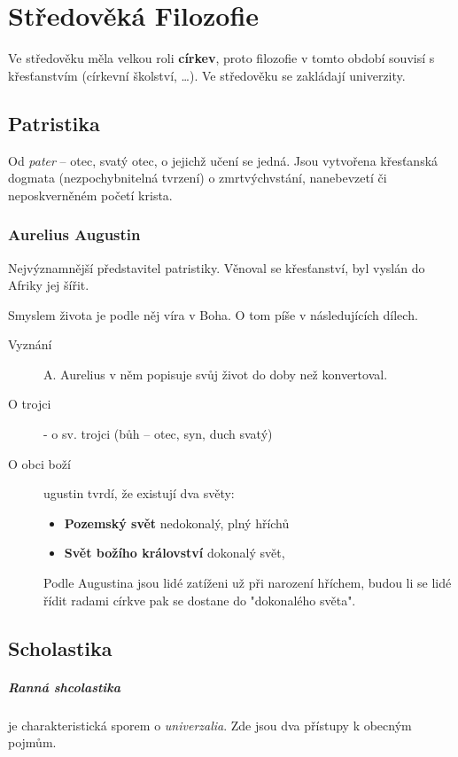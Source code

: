 \documentclass[10pt,a4paper,
twoside,%
]{report}
\begin{document}
\chapter{Středověká Filozofie}

Ve středověku měla velkou roli \textbf{církev}, proto filozofie v tomto období  souvisí s křesťanstvím (církevní školství, \dots). Ve středověku se zakládají univerzity.

\section{Patristika}

Od \emph{pater} -- otec, svatý otec, o jejichž učení se jedná. Jsou vytvořena křesťanská dogmata (nezpochybnitelná tvrzení) o zmrtvýchvstání, nanebevzetí či neposkverněném početí krista.

\subsection{Aurelius Augustin}
Nejvýznamnější představitel patristiky. Věnoval se křesťanství, byl vyslán do Afriky jej šířit.

Smyslem života je podle něj víra v Boha. O tom píše v následujících dílech. 
\begin{description}
  \item[Vyznání] A. Aurelius v něm popisuje svůj život do doby než konvertoval.
  \item[O trojci] - o sv. trojci (bůh -- otec, syn, duch svatý)
  \item[O obci boží] ugustin tvrdí, že existují dva světy:
  \begin{itemize}
  \item \textbf{Pozemský svět} nedokonalý, plný hříchů
  \item \textbf{Svět božího království} dokonalý svět, 
  \end{itemize}
  Podle Augustina jsou lidé zatíženi už při narození hříchem, budou li se lidé řídit radami církve pak se dostane do "dokonalého světa".
\end{description}


\section{Scholastika}
\paragraph{Ranná shcolastika} je charakteristická sporem o \emph{univerzalia}. Zde jsou dva přístupy k obecným pojmům. 
\end{document}
